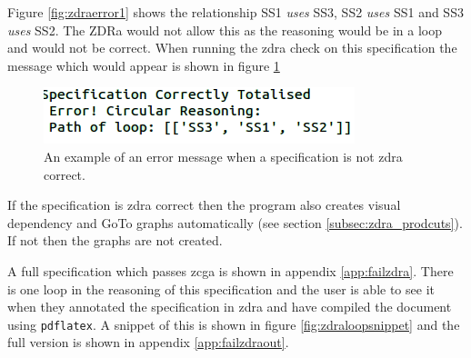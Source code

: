 Figure \ref{fig:zdraerror1} shows the relationship SS1 \textit{uses} SS3, SS2 \textit{uses} SS1 and SS3 \textit{uses} SS2. The ZDRa would not allow this as the reasoning would be in a loop and would not be correct. When running the \gls{zdra} check on this specification the message which would appear is shown in figure \ref{fig:zdraerrormess}

\begin{figure}[H]
\centering
\includegraphics[scale=0.4]{Figures/zdra/loopmessage.png}
\caption{An example of an error message when a specification is not \gls{zdra} correct. \label{fig:zdraerrormess}}
\end{figure}

If the specification is \gls{zdra} correct then the program also creates visual dependency and GoTo graphs automatically (see section \ref{subsec:zdra_prodcuts}). If not then the graphs are not created.

A full specification which passes \gls{zcga} is shown in appendix \ref{app:failzdra}. There is one loop in the reasoning of this specification and the user is able to see it when they annotated the specification in \gls{zdra} and have compiled the document using \texttt{pdflatex}. A snippet of this is shown in figure \ref{fig:zdraloopsnippet} and the full version is shown in appendix \ref{app:failzdraout}.

